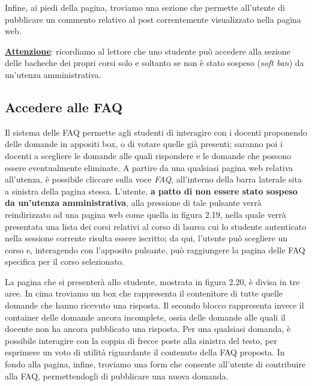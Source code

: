 \documentclass [a4paper,11pt]{book}
\begin{document}
Infine, ai piedi della pagina, troviamo una sezione che permette all'utente di pubblicare un commento relativo al post correntemente visualizzato nella pagina web.

\medskip

\textbf{\underline{Attenzione}}: ricordiamo al lettore che uno studente può accedere alla sezione delle bacheche dei propri corsi solo e soltanto se non è stato sospeso (\emph{soft ban}) da un'utenza amministrativa.

\medskip

\subsection{Accedere alle FAQ}

Il sistema delle FAQ permette agli studenti di interagire con i docenti proponendo delle domande in appositi box, o di votare quelle già presenti; saranno poi i docenti a scegliere le domande alle quali rispondere e le domande che possono essere eventualmente eliminate. A partire da una qualsiasi pagina web relativa all'utenza, è possibile cliccare sulla voce \emph{FAQ}, all'interno della barra laterale sita a sinistra della pagina stessa. L'utente, \textbf{a patto di non essere stato sospeso da un'utenza amministrativa}, alla pressione di tale pulsante verrà reindirizzato ad una pagina web come quella in figura 2.19, nella quale verrà presentata una lista dei corsi relativi al corso di laurea cui lo studente autenticato nella sessione corrente risulta essere iscritto; da qui, l'utente può scegliere un corso e, interagendo con l'apposito pulsante, può raggiungere la pagina delle FAQ specifica per il corso selezionato.


La pagina che si presenterà allo studente, mostrata in figura 2.20, è divisa in tre aree. In cima troviamo un box che rappresenta il contenitore di tutte quelle domande che hanno ricevuto una risposta. Il secondo blocco rappresenta invece il container delle domande ancora incomplete, ossia delle domande alle quali il docente non ha ancora pubblicato una risposta. Per una qualsiasi domanda, è possibile interagire con la coppia di frecce poste alla sinistra del testo, per esprimere un voto di utilità riguardante il contenuto della FAQ proposta. In fondo alla pagina, infine, troviamo una form che consente all'utente di contribuire alla FAQ, permettendogli di pubblicare una nuova domanda. 

\end{document}
